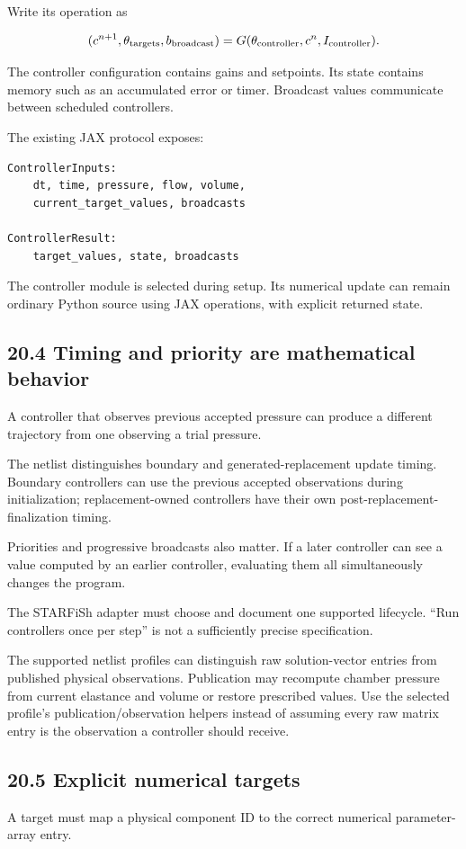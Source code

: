 \documentclass[11pt,a4paper]{article}
\begin{document}
Write its operation as


\begingroup\small
\[
(c^{n+1},\theta_{\rm targets},b_{\rm broadcast})
=
G(\theta_{\rm controller},c^n,I_{\rm controller}).
\]
\endgroup


The controller configuration contains gains and setpoints. Its state contains memory such as an accumulated error or timer. Broadcast values communicate between scheduled controllers.

The existing JAX protocol exposes:


\begin{lstlisting}
ControllerInputs:
    dt, time, pressure, flow, volume,
    current_target_values, broadcasts

ControllerResult:
    target_values, state, broadcasts
\end{lstlisting}
The controller module is selected during setup. Its numerical update can remain ordinary Python source using JAX operations, with explicit returned state.

\subsection{20.4 Timing and priority are mathematical behavior}
A controller that observes previous accepted pressure can produce a different trajectory from one observing a trial pressure.

The netlist distinguishes boundary and generated-replacement update timing. Boundary controllers can use the previous accepted observations during initialization; replacement-owned controllers have their own post-replacement-finalization timing.

Priorities and progressive broadcasts also matter. If a later controller can see a value computed by an earlier controller, evaluating them all simultaneously changes the program.

The STARFiSh adapter must choose and document one supported lifecycle. \textquotedblleft{}Run controllers once per step\textquotedblright{} is not a sufficiently precise specification.

The supported netlist profiles can distinguish raw solution-vector entries from published physical observations. Publication may recompute chamber pressure from current elastance and volume or restore prescribed values. Use the selected profile's publication/observation helpers instead of assuming every raw matrix entry is the observation a controller should receive.

\subsection{20.5 Explicit numerical targets}
A target must map a physical component ID to the correct numerical parameter-array entry.
\end{document}
